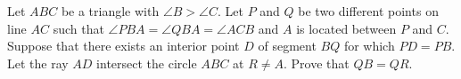 Let $ABC$ be a triangle with $\angle B > \angle C$. Let $P$ and $Q$ be two different points on line $AC$ such that $\angle PBA = \angle QBA = \angle ACB$ and $A$ is located between $P$ and $C$. Suppose that there exists an interior point $D$ of segment $BQ$ for which $PD = PB$. Let the ray $AD$ intersect the circle $ABC$ at $R \neq A$. Prove that $QB = QR$.
